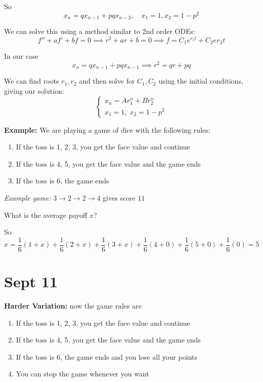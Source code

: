\documentclass[12pt]{report}
\begin{document}
    So 
    \[x_n = qx_{n-1} + pqx_{n-2}, \quad x_1 = 1, x_2 = 1 - p^2\]

    We can solve this using a method similar to 2nd order ODEs: 
    \[f'' + af' + bf =0 \implies r^2 + ar + b = 0 \implies f = C_1e^{r_1 t} + C_2e{r_2 t}\]

    In our case 
    \[x_n = qx_{n-1} + pqx_{n-1} \implies r^2 = qr + pq\]

    We can find roots $r_1, r_2$ and then solve for $C_1, C_2$ using the initial conditions, giving our solution:
    \[\begin{cases}
        x_n = Ar_1^n + Br_2^n\\ 
        x_1 = 1, \; x_2 = 1- p^2
    \end{cases}\]

    \textbf{Example:} We are playing a game of dice with the following rules:

    \begin{enumerate}
        \item If the toss is 1, 2, 3, you get the face value and continue 
        \item If the toss is 4, 5, you get the face value and the game ends
        \item If the toss is 6, the game ends 
    \end{enumerate}

    \emph{Example game:} $3 \to 2 \to 2 \to 4$ gives score $11$

    What is the average payoff $x$? 
    \begin{center}
    \end{center}

    So 
    \[x = \frac{1}{6}(1 + x) + \frac{1}{6}(2 + x) + \frac{1}{6}(3 + x) + \frac{1}{6}(4 + 0) + \frac{1}{6}(5 + 0) + \frac{1}{6}(0) = 5\]

\section{Sept 11}
    \textbf{Harder Variation:} now the game rules are 
    \begin{enumerate}
        \item If the toss is 1, 2, 3, you get the face value and continue 
        \item If the toss is 4, 5, you get the face value and the game ends
        \item If the toss is 6, the game ends and you lose all your points
        \item You can stop the game whenever you want 
    \end{enumerate}
\end{document}

